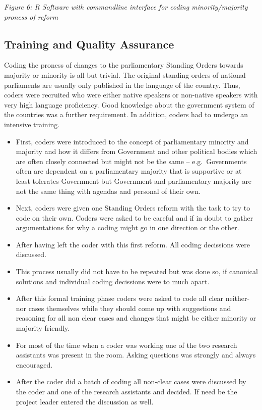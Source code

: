 \documentclass[10pt,]{article}
\providecommand{\tightlist}{%
  \setlength{\itemsep}{0pt}\setlength{\parskip}{0pt}}
\begin{document}
\emph{Figure 6: R Software with commandline interface for coding
minority/majority proness of reform}

\subsection{Training and Quality
Assurance}\label{training-and-quality-assurance}

Coding the proness of changes to the parliamentary Standing Orders
towards majority or minority is all but trivial. The original standing
orders of national parliaments are usually only published in the
language of the country. Thus, coders were recruited who were either
native speakers or non-native speakers with very high language
proficiency. Good knowledge about the government system of the countries
was a further requirement. In addition, coders had to undergo an
intensive training.

\begin{itemize}
\tightlist
\item
  First, coders were introduced to the concept of parliamentary minority
  and majority and how it differs from Government and other political
  bodies which are often closely connected but might not be the same --
  e.g.~Governments often are dependent on a parliamentary majority that
  is supportive or at least tolerates Government but Government and
  parliamentary majority are not the same thing with agendas and
  personal of their own.
\item
  Next, coders were given one Standing Orders reform with the task to
  try to code on their own. Coders were asked to be careful and if in
  doubt to gather argumentations for why a coding might go in one
  direction or the other.
\item
  After having left the coder with this first reform. All coding
  decissions were discussed.
\item
  This process usually did not have to be repeated but was done so, if
  canonical solutions and individual coding decissions were to much
  apart.
\item
  After this formal training phase coders were asked to code all clear
  neither-nor cases themselves while they should come up with
  suggestions and reasoning for all non clear cases and changes that
  might be either minority or majority friendly.
\item
  For most of the time when a coder was working one of the two research
  assistants was present in the room. Asking questions was strongly and
  always encouraged.
\item
  After the coder did a batch of coding all non-clear cases were
  discussed by the coder and one of the research assistants and decided.
  If need be the project leader entered the discussion as well.
\end{itemize}
\end{document}
